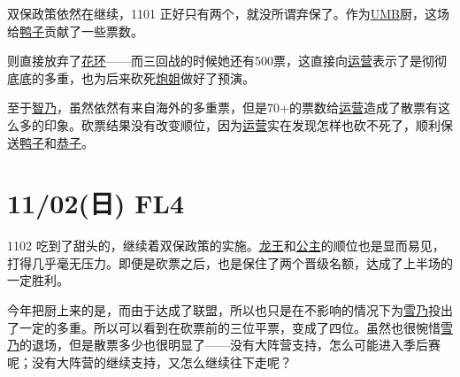 
双保政策依然在继续，1101 正好只有两个，就没所谓弃保了。作为\uline{UMB}厨，这场给\uline{鸭子}贡献了一些票数。

则直接放弃了\uline{花环}——而三回战的时候她还有500票，这直接向\uline{运营}表示了是彻彻底底的多重，也为后来砍死\uline{炮姐}做好了预演。

至于\uline{智乃}，虽然依然有来自海外的多重票，但是70+的票数给\uline{运营}造成了散票有这么多的印象。砍票结果没有改变顺位，因为\uline{运营}实在发现怎样也砍不死了，顺利保送\uline{鸭子}和\uline{恭子}。

\section{11/02(日) FL4}


1102 吃到了甜头的，继续着双保政策的实施。\uline{龙王}和\uline{公主}的顺位也是显而易见，打得几乎毫无压力。即便是砍票之后，也是保住了两个晋级名额，达成了上半场的一定胜利。

今年把厨上来的是，而由于达成了联盟，所以也只是在不影响的情况下为\uline{雪乃}投出了一定的多重。所以可以看到在砍票前的三位平票，变成了四位。虽然也很惋惜\uline{雪乃}的退场，但是散票多少也很明显了——没有大阵营支持，怎么可能进入季后赛呢；没有大阵营的继续支持，又怎么继续往下走呢？

